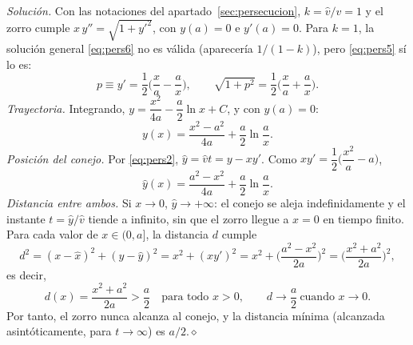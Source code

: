 \documentclass[11pt,twoside]{article}
\newcommand\vh{\hat v}
\newcommand\xh{\hat x}
\newcommand\yhh{\hat y}
\newcommand\fin{\hfill\textcolor{muted}{$\diamond$}}
\begin{document}
\emph{Solución.} Con las notaciones del apartado~\ref{sec:persecucion}, $k=\vh/v=1$ y el zorro cumple $x\,y''=\sqrt{1+y'^2}$,
con $y(a)=0$ e $y'(a)=0$. Para $k=1$, la solución general \eqref{eq:pers6} no es válida (aparecería $1/(1-k)$), pero
\eqref{eq:pers5} sí lo es:
\begin{equation*}
p\equiv y'=\frac12\Big(\frac xa-\frac ax\Big),\qquad\sqrt{1+p^2}=\frac12\Big(\frac xa+\frac ax\Big).
\end{equation*}
\emph{Trayectoria.} Integrando, $y=\dfrac{x^2}{4a}-\dfrac a2\ln x+C$, y con $y(a)=0$:
\begin{equation*}
y(x)=\frac{x^2-a^2}{4a}+\frac a2\ln\frac ax.
\end{equation*}
\emph{Posición del conejo.} Por \eqref{eq:pers2}, $\yhh=\vh t=y-xy'$. Como $xy'=\dfrac12\Big(\dfrac{x^2}{a}-a\Big)$,
\begin{equation*}
\yhh(x)=\frac{a^2-x^2}{4a}+\frac a2\ln\frac ax.
\end{equation*}
\emph{Distancia entre ambos.} Si $x\to0$, $\yhh\to+\infty$: el conejo se aleja indefinidamente y el instante $t=\yhh/\vh$
tiende a infinito, sin que el zorro llegue a $x=0$ en tiempo finito. Para cada valor de $x\in(0,a]$, la distancia $d$ cumple
\begin{equation*}
d^2=(x-\xh)^2+(y-\yhh)^2=x^2+(xy')^2=x^2+\Big(\frac{a^2-x^2}{2a}\Big)^2=\Big(\frac{x^2+a^2}{2a}\Big)^2,
\end{equation*}
es decir,
\begin{equation}\label{eq:p6}
d(x)=\frac{x^2+a^2}{2a}>\frac a2\quad\text{para todo }x>0,\qquad d\to\frac a2\ \text{cuando }x\to0.
\end{equation}
Por tanto, el zorro nunca alcanza al conejo, y la distancia mínima (alcanzada asintóticamente, para $t\to\infty$) es $a/2$.\fin
\end{document}
